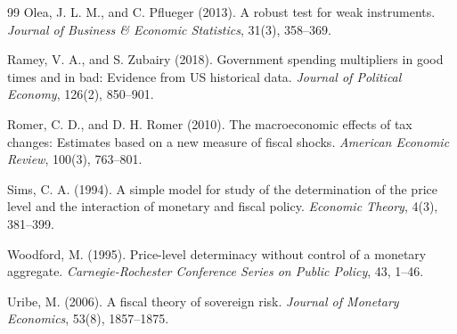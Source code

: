 \documentclass[12pt,a4paper]{article}
\begin{document}
\begin{thebibliography}{99}
Olea, J. L. M., and C. Pflueger (2013).
A robust test for weak instruments.
\emph{Journal of Business \& Economic Statistics}, 31(3), 358--369.

Ramey, V. A., and S. Zubairy (2018).
Government spending multipliers in good times and in bad: Evidence from US historical data.
\emph{Journal of Political Economy}, 126(2), 850--901.

Romer, C. D., and D. H. Romer (2010).
The macroeconomic effects of tax changes: Estimates based on a new measure of fiscal shocks.
\emph{American Economic Review}, 100(3), 763--801.

Sims, C. A. (1994).
A simple model for study of the determination of the price level and the interaction of monetary and fiscal policy.
\emph{Economic Theory}, 4(3), 381--399.

Woodford, M. (1995).
Price-level determinacy without control of a monetary aggregate.
\emph{Carnegie-Rochester Conference Series on Public Policy}, 43, 1--46.

Uribe, M. (2006).
A fiscal theory of sovereign risk.
\emph{Journal of Monetary Economics}, 53(8), 1857--1875.

\end{thebibliography}
\end{document}
